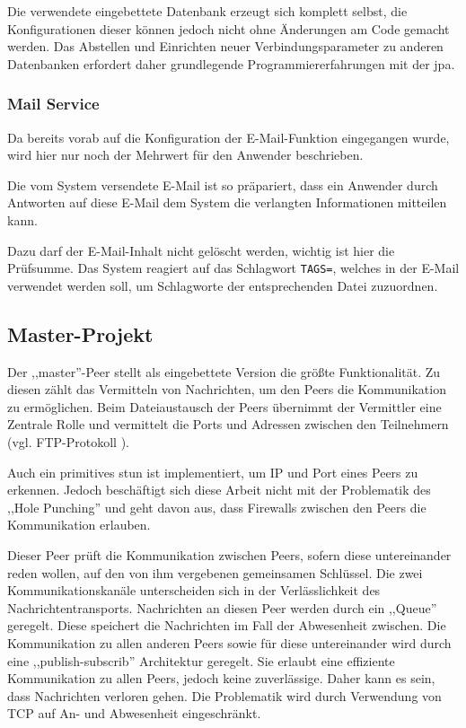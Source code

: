 \documentclass[oneside, ngerman, toc=bibliography,bibliography=totoc,listof=entryprefix, open=right,numbers=noenddot,fontsize=12pt]{scrbook}
\begin{document}
Die verwendete eingebettete Datenbank erzeugt sich komplett selbst, die Konfigurationen dieser können jedoch nicht ohne Änderungen am Code gemacht werden. Das Abstellen und Einrichten neuer Verbindungsparameter zu anderen Datenbanken erfordert daher grundlegende Programmiererfahrungen mit der \acrshort{jpa}.



\subsubsection{Mail Service}
Da bereits vorab auf die Konfiguration der E-Mail-Funktion eingegangen wurde, wird hier nur noch der Mehrwert für den Anwender beschrieben.

Die vom System versendete E-Mail ist so präpariert, dass ein Anwender durch Antworten auf diese E-Mail dem System die verlangten Informationen mitteilen kann.

Dazu darf der E-Mail-Inhalt nicht gelöscht werden, wichtig ist hier die Prüfsumme. Das System reagiert auf das Schlagwort \verb|TAGS=|, welches in der E-Mail verwendet werden soll, um Schlagworte der entsprechenden Datei zuzuordnen.



\subsection{Master-Projekt}

Der ,,master''-Peer stellt als eingebettete Version die größte  Funktionalität. Zu diesen zählt das Vermitteln von Nachrichten, um den Peers die Kommunikation zu ermöglichen. Beim Dateiaustausch der Peers übernimmt der Vermittler eine Zentrale Rolle und vermittelt die Ports und Adressen zwischen den Teilnehmern (vgl. FTP-Protokoll \cite{rfc959}).


Auch ein primitives \acrshort{stun} ist implementiert, um IP und Port eines Peers zu erkennen. Jedoch beschäftigt sich diese Arbeit nicht mit der Problematik des ,,Hole Punching'' und geht davon aus, dass Firewalls zwischen den Peers die Kommunikation erlauben.


Dieser Peer prüft die Kommunikation zwischen Peers, sofern diese untereinander reden wollen, auf den von ihm vergebenen gemeinsamen Schlüssel.
Die zwei Kommunikationskanäle unterscheiden sich in der Verlässlichkeit des Nachrichtentransports. Nachrichten an diesen Peer werden durch ein ,,Queue'' geregelt. Diese speichert die Nachrichten im Fall der Abwesenheit zwischen. Die Kommunikation zu allen anderen Peers sowie für diese untereinander wird durch eine ,,publish-subscrib'' Architektur geregelt. Sie erlaubt eine effiziente Kommunikation zu allen Peers, jedoch keine zuverlässige. Daher kann es sein, dass Nachrichten verloren gehen. Die Problematik wird durch Verwendung von TCP auf An- und Abwesenheit eingeschränkt. 
\end{document}
